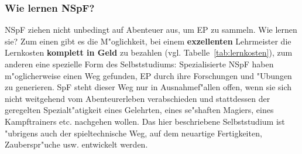 \documentclass[10pt,a4paper,germanpar]{article}
\begin{document}
\subsubsection{Wie lernen NSpF?}

NSpF ziehen nicht unbedingt auf Abenteuer aus, um EP zu sammeln. Wie
lernen sie?  Zum einen gibt es die M"oglichkeit, bei einem
\textbf{exzellenten} Lehrmeister die Lernkosten \textbf{komplett in
  Geld} zu bezahlen (vgl.  Tabelle~\ref{tab:lernkosten}), zum anderen
eine spezielle Form des Selbststudiums: Spezialisierte NSpF haben
m"oglicherweise einen Weg gefunden, EP durch ihre Forschungen und
"Ubungen zu generieren. SpF steht dieser Weg nur in Ausnahmef"allen
offen, wenn sie sich nicht weitgehend vom Abenteurerleben
verabschieden und stattdessen der geregelten Spezialt"atigkeit eines
Gelehrten, eines se"shaften Magiers, eines Kampftrainers etc.
nachgehen wollen.  Das hier beschriebene Selbststudium ist "ubrigens
auch der spieltechnische Weg, auf dem neuartige Fertigkeiten,
Zauberspr"uche usw. entwickelt werden.
\end{document}
